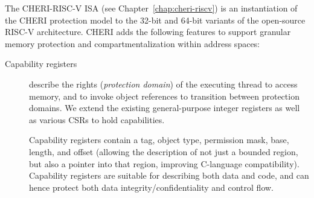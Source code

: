 
The CHERI-RISC-V ISA (see Chapter~\ref{chap:cheri-riscv}) is an instantiation of
the CHERI protection model to the 32-bit and 64-bit variants of the open-source RISC-V architecture.
CHERI adds the following features to support granular memory protection
and compartmentalization within address spaces:


\begin{description}
\item[Capability registers] describe the rights ({\em protection domain}) of
the executing thread to
access memory, and to invoke object references
to transition between protection domains.
We extend the existing general-purpose integer registers as well as
various CSRs to hold capabilities.

Capability registers contain a tag, object type, permission mask, base, length, and offset (allowing the description of not just a bounded region, but also a pointer into that region, improving C-language compatibility).
Capability registers are suitable for describing both data and code, and can hence protect both data integrity/confidentiality and control flow.


\end{description}
